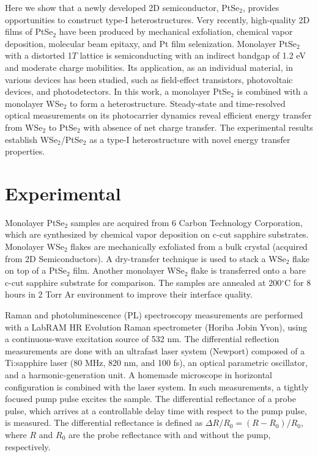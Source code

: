 \documentclass[10pt]{iopart}
\begin{document}
Here we show that a newly developed 2D semiconductor, PtSe$_2$\cite{wang2021layered},   provides  opportunities to construct type-I heterostructures. Very recently, high-quality 2D films of PtSe$_2$ have been produced by mechanical exfoliation\cite{zhao2017high,ciarrocchi2018thickness,yu2018atomically,liang2019high,szydlowska2020spectroscopic},  chemical vapor deposition\cite{wang2016facile,yim2016high,shi2019chemical,hu2019unveiling}, molecular beam epitaxy\cite{yan2017high},   and Pt film selenization\cite{wang2015monolayer,yao2017direct,o2016raman}.  Monolayer PtSe$_2$ with a distorted 1$T$ lattice \cite{wang2015monolayer,o2016raman,lin2017intrinsically} is semiconducting with an indirect bandgap of 1.2 eV \cite{zhao2017high,wang2015monolayer,guo2016biaxial,xie2019optical} and moderate charge mobilities\cite{zhao2017high,yang2019homogeneous}.  Its application, as an individual material, in various devices has been studied, such as field-effect transistors\cite{zhao2017high,urban2020isotropic},  photovoltaic devices\cite{yim2016high},  and photodetectors\cite{zhao2017high,yu2018atomically,liang2019high,yim2016high,su2018phase,yim2018wide,long2020scalable,yang2021high,luo2019pdse2,wang2020high,wang2020bound}.  In this work, a monolayer PtSe$_2$ is combined with a monolayer WSe$_2$ to form a heterostructure. Steady-state and time-resolved optical measurements on its photocarrier dynamics reveal efficient energy transfer from WSe$_2$ to PtSe$_2$ with absence of net charge transfer. The experimental results establish WSe$_2$/PtSe$_2$ as a type-I heterostructure with novel energy transfer properties.

\section{Experimental}
Monolayer PtSe$_2$ samples are acquired from 6 Carbon Technology Corporation, which are synthesized by chemical vapor deposition on c-cut sapphire substrates. Monolayer WSe$_2$ flakes are mechanically exfoliated from a bulk crystal (acquired from 2D Semiconductors). A dry-transfer technique is used to stack a WSe$_2$ flake on top of a PtSe$_2$ film.  Another monolayer WSe$_2$ flake is transferred onto a bare c-cut sapphire substrate for comparison. The samples are annealed at 200$^\circ$C for 8 hours in 2 Torr Ar environment to improve their interface quality. 

Raman and photoluminescence (PL) spectroscopy measurements are performed with a LabRAM HR Evolution Raman spectrometer (Horiba Jobin Yvon), using a continuous-wave excitation source of 532 nm. The differential reflection measurements are done with an ultrafast laser system (Newport) composed of a Ti:sapphire laser (80 MHz, 820 nm, and 100 fs), an optical parametric oscillator, and a harmonic-generation unit.  A homemade microscope in horizontal configuration is combined with the laser system\cite{bian2020dynamics}.  In such measurements, a tightly focused pump pulse excites the sample. The differential reflectance of a probe pulse, which arrives at a controllable delay time with respect to the pump pulse, is measured. The differential reflectance is defined as $\Delta R/R_0 = (R-R_0)/R_0$, where $R$ and $R_0$ are the probe reflectance with and without the pump, respectively.
\end{document}
